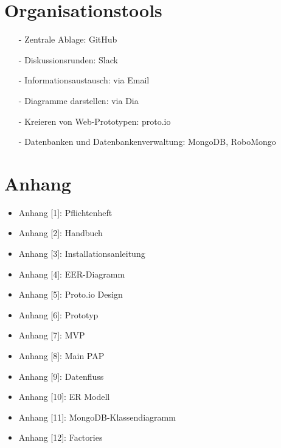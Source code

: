 \documentclass[12pt,a4paper]{article}
\begin{document}
\section*{Organisationstools}
\begin{itemize}
\item[-]Zentrale Ablage: GitHub
\item[-]Diskussionsrunden: Slack
\item[-]Informationsaustausch: via Email
\item[-]Diagramme darstellen: via Dia 
\item[-]Kreieren von Web-Prototypen: proto.io
\item[-]Datenbanken und Datenbankenverwaltung: MongoDB, RoboMongo
\end{itemize}
\newpage
\section*{Anhang}
\begin{itemize}
\item Anhang [1]: Pflichtenheft
\item Anhang [2]: Handbuch
\item Anhang [3]: Installationsanleitung
\item Anhang [4]: EER-Diagramm
\item Anhang [5]: Proto.io Design
\item Anhang [6]: Prototyp
\item Anhang [7]: MVP
\item Anhang [8]: Main PAP
\item Anhang [9]: Datenfluss
\item Anhang [10]: ER Modell 
\item Anhang [11]: MongoDB-Klassendiagramm
\item Anhang [12]: Factories



\end{itemize}
\end{document}
